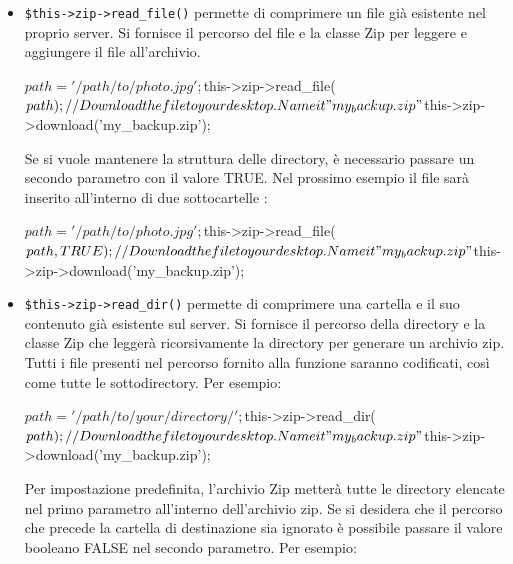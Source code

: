 \begin{itemize}

\item \verb|$this->zip->read_file()| permette di comprimere un file già esistente nel proprio server. Si fornisce il percorso del file e la classe Zip per leggere e aggiungere il file all'archivio.

\begin{code}
$path = '/path/to/photo.jpg';

$this->zip->read_file($path); 

// Download the file to your desktop. Name it "my_backup.zip"
$this->zip->download('my_backup.zip');
\end{code}

Se si vuole mantenere la struttura delle directory, è necessario passare un secondo parametro con il valore TRUE. Nel prossimo esempio il file  sarà inserito all'interno di due sottocartelle :

\begin{code}
$path = '/path/to/photo.jpg';

$this->zip->read_file($path, TRUE); 

// Download the file to your desktop. Name it "my_backup.zip"
$this->zip->download('my_backup.zip');
\end{code}

\item \verb|$this->zip->read_dir()| permette di comprimere una cartella e il suo contenuto già esistente sul server. Si fornisce il percorso della directory e la classe Zip che leggerà ricorsivamente la directory per generare un archivio zip. Tutti i file presenti nel percorso fornito alla funzione saranno codificati, così come tutte le sottodirectory. Per esempio:

\begin{code}
$path = '/path/to/your/directory/';

$this->zip->read_dir($path); 

// Download the file to your desktop. Name it "my_backup.zip"
$this->zip->download('my_backup.zip');
\end{code}

Per impostazione predefinita, l'archivio Zip metterà tutte le directory elencate nel primo parametro all'interno dell'archivio zip. Se si desidera che il percorso che precede la cartella di destinazione sia ignorato è possibile passare il valore booleano FALSE nel secondo parametro. Per esempio:


\end{itemize}
